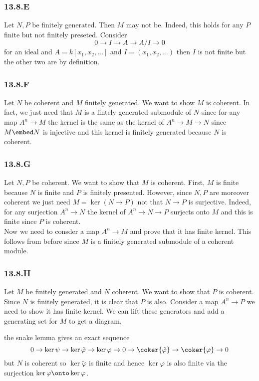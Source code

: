 \documentclass[12pt]{article}
\theoremstyle{plain}
\begin{document}
\subsubsection{13.8.E}

Let $N,P$ be finitely generated. Then $M$ may not be. Indeed, this holds for any $P$ finite but not finitely preseted. Consider 
\[ 0 \to I \to A \to A / I \to 0 \]
for an ideal and $A = k[x_1, x_2, \dots]$ and $I = (x_1, x_2, \dots)$ then $I$ is not finite but the other two are by definition.

\subsubsection{13.8.F}

Let $N$ be coherent and $M$ finitely generated. We want to show $M$ is coherent. In fact, we just need that $M$ is a fintely generated submodule of $N$ since for any map $A^n \to M$ the kernel is the same as the kernel of $A^n \to M \to N$ since $M \embed N$ is injective and this kernel is finitely generated because $N$ is coherent. 

\subsubsection{13.8.G}

Let $N,P$ be coherent. We want to show that $M$ is coherent. First, $M$ is finite because $N$ is finite and $P$ is finitely presented. However, since $N,P$ are moreover coherent we just need $M = \ker{(N \to P)}$ not that $N \to P$ is surjective. Indeed, for any surjection $A^n \to N$ the kernel of $A^n \to N \to P$ surjects onto $M$ and this is finite since $P$ is coherent. 
\bigskip\\
Now we need to consder a map $A^n \to M$ and prove that it has finite kernel. This follows from before since $M$ is a finitely generated submodule of a coherent module.

\subsubsection{13.8.H}

Let $M$ be finitely generated and $N$ coherent. We want to show that $P$ is coherent. Since $N$ is finitely generated, it is clear that $P$ is also. Consider a map $A^n \to P$ we need to show it has finite kernel. We can lift these generators and add a generating set for $M$ to get a diagram,
\begin{center}
\end{center}
the snake lemma gives an exact sequence
\[ 0 \to \ker{\psi} \to \ker{\tilde{\varphi}} \to \ker{\varphi} \to 0 \to \coker{\tilde{\varphi}} \to \coker{\varphi} \to 0 \]
but $N$ is coherent so $\ker{\tilde{\varphi}}$ is finite and hence $\ker{\varphi}$ is also finite via the surjection $\ker{\varphi} \onto \ker{\varphi}$.
\end{document}

